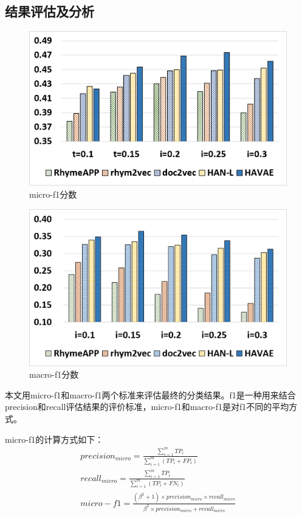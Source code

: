 \subsection{结果评估及分析}
\begin{figure}[!h]
    \centering
    \includegraphics[width=12cm]{micro.png}
    \caption{micro-f1分数}
    \label{fig:micro}
\end{figure}
\begin{figure}[!h]
    \centering
    \includegraphics[width=12cm]{macro.png}
    \caption{macro-f1分数}
    \label{fig:macro}
\end{figure}
本文用micro-f1和macro-f1两个标准来评估最终的分类结果。f1是一种用来结合precision和recall评估结果的评价标准，micro-f1和macro-f1是对f1不同的平均方式。\par
micro-f1的计算方式如下：
\begin{equation}
  \label{eq:micro}
  \begin{gathered}
    precision_{micro} = \frac{\sum^m_{i=1}TP_i}{\sum^m_{i=1}(TP_i + FP_i)}\\
    recall_{micro} = \frac{\sum^m_{i=1}TP_i}{\sum^m_{i=1}(TP_i + FN_i)}\\
    micro-f1 = \frac{(\beta^2 + 1) \times precision_{micro} \times recall_{micro}}{\beta^2 \times precision_{micro} + recall_{micro}}
  \end{gathered}
\end{equation}
